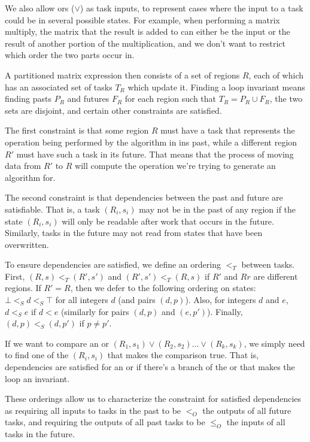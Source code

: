 \documentclass[12pt,letterpaper]{article}
\begin{document}
We also allow ors ($\vee$) as task inputs, to represent cases where the input to a task could be in several possible states.
For example, when performing a matrix multiply, the matrix that the result is added to can either be the input or the result of another portion of the multiplication, and we don't want to restrict which order the two parts occur in.

A partitioned matrix expression then consists of a set of regions $R$, each of which has an associated set of tasks $T_R$ which update it.
Finding a loop invariant means finding pasts $P_R$ and futures $F_R$ for each region such that $T_R = P_R \cup F_R$, the two sets are disjoint, and certain other constraints are satisfied.

The first constraint is that some region $R$ must have a task that represents the operation being performed by the algorithm in ins past, while a different region $R'$ must have such a task in its future.
That means that the process of moving data from $R'$ to $R$ will compute the operation we're trying to generate an algorithm for.

The second constraint is that dependencies between the past and future are satisfiable.
That is, a task $(R_i, s_i)$ may not be in the past of any region if the state $(R_i, s_i)$ will only be readable after work that occurs in the future.
Similarly, tasks in the future may not read from states that have been overwritten.

To ensure dependencies are satisfied, we define an ordering $<_T$ between tasks.
First, $(R, s) <_T (R', s')$ and $(R', s') <_T (R, s)$ if $R'$ and $Rr$ are different regions.
If $R' = R$, then we defer to the following ordering on states: $\bot <_S d <_S \top$ for all integers $d$ (and pairs $(d, p)$).
Also, for integers $d$ and $e$, $d <_S e$ if $d < e$ (similarly for pairs $(d, p)$ and $(e, p')$).
Finally, $(d, p) <_S (d, p')$ if $p \neq p'$.

If we want to compare an or $(R_1, s_1) \vee (R_2, s_2) \ldots \vee (R_k, s_k)$, we simply need to find one of the $(R_i, s_i)$ that makes the comparison true.
That is, dependencies are satisfied for an or if there's a branch of the or that makes the loop an invariant.

These orderings allow us to characterize the constraint for satisfied dependencies as requiring all inputs to tasks in the past to be $<_O$ the outputs of all future tasks, and requiring the outputs of all past tasks to be $\leq_O$ the inputs of all tasks in the future.
\end{document}
